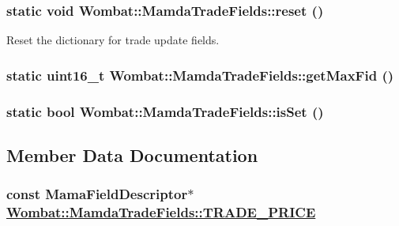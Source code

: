 \hypertarget{classWombat_1_1MamdaTradeFields_32e1cb689e126579d6298cbd91fe44fd}{
\subsubsection[reset]{\setlength{\rightskip}{0pt plus 5cm}static void Wombat::Mamda\-Trade\-Fields::reset ()}}
\label{classWombat_1_1MamdaTradeFields_32e1cb689e126579d6298cbd91fe44fd}


Reset the dictionary for trade update fields. 

\hypertarget{classWombat_1_1MamdaTradeFields_7eeedbd0f1b765a307258dc799177881}{
\subsubsection[getMaxFid]{\setlength{\rightskip}{0pt plus 5cm}static uint16\_\-t Wombat::Mamda\-Trade\-Fields::get\-Max\-Fid ()}}
\label{classWombat_1_1MamdaTradeFields_7eeedbd0f1b765a307258dc799177881}


\hypertarget{classWombat_1_1MamdaTradeFields_185ffef6d974050df73f337f52ac4f68}{
\subsubsection[isSet]{\setlength{\rightskip}{0pt plus 5cm}static bool Wombat::Mamda\-Trade\-Fields::is\-Set ()}}
\label{classWombat_1_1MamdaTradeFields_185ffef6d974050df73f337f52ac4f68}




\subsection{Member Data Documentation}
\hypertarget{classWombat_1_1MamdaTradeFields_c31684b8cd859faa39f3667d800251a4}{
\subsubsection[TRADE\_\-PRICE]{\setlength{\rightskip}{0pt plus 5cm}const Mama\-Field\-Descriptor$\ast$ \hyperlink{classWombat_1_1MamdaTradeFields_c31684b8cd859faa39f3667d800251a4}{Wombat::Mamda\-Trade\-Fields::TRADE\_\-PRICE}}}
\label{classWombat_1_1MamdaTradeFields_c31684b8cd859faa39f3667d800251a4}


